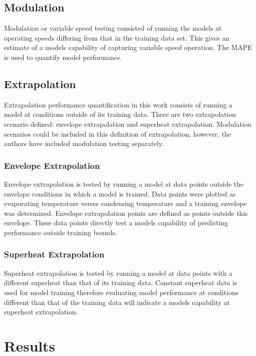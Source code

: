 \documentclass[preprint,11pt,authoryear]{elsarticle}
\begin{document}
\subsection{Modulation}

Modulation or variable speed testing consisted of running the models at operating speeds differing from that in the training data set. This gives an estimate of a models capability of capturing variable speed operation. The MAPE is used to quantify model performance. 

\subsection{Extrapolation}

Extrapolation performance quantification in this work consists of running a model at conditions outside of its training data. There are two extrapolation scenario defined: envelope extrapolation and superheat extrapolation. Modulation scenarios could be included in this definition of extrapolation, however, the authors have included modulation testing separately. 

\subsubsection{Envelope Extrapolation}

Envelope extrapolation is tested by running a model at data points outside the envelope conditions in which a model is trained. Data points were plotted as evaporating temperature verses condensing temperature and a training envelope was determined. Envelope extrapolation points are defined as points outside this envelope. These data points directly test a models capability of predicting performance outside training bounds. 

\subsubsection{Superheat Extrapolation}

Superheat extrapolation is tested by running a model at data points with a different superheat than that of its training data. Constant superheat data is used for model training therefore evaluating model performance at conditions different than that of the training data will indicate a models capability at superheat extrapolation. 
 
\section{Results}
\end{document}
